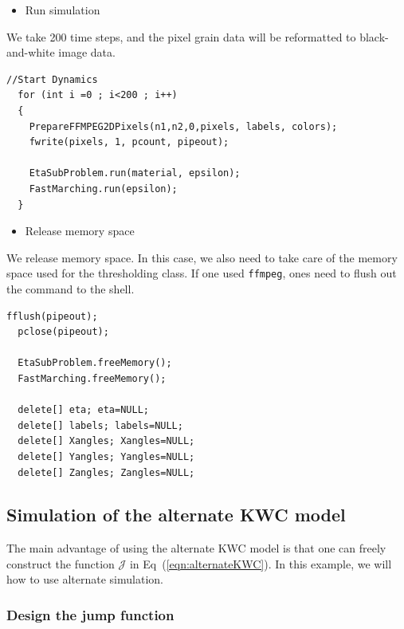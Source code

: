 \documentclass[11pt]{article}
\begin{document}
\begin{itemize} \item Run simulation \end{itemize}
We take 200 time steps, and the pixel grain data will be 
reformatted to black-and-white image data. \\
\begin{tcolorbox}
\begin{lstlisting}[basicstyle=\footnotesize]
  //Start Dynamics
  for (int i =0 ; i<200 ; i++)
  {
    PrepareFFMPEG2DPixels(n1,n2,0,pixels, labels, colors);
    fwrite(pixels, 1, pcount, pipeout);
      
    EtaSubProblem.run(material, epsilon);
    FastMarching.run(epsilon);
  }
\end{lstlisting}
\end{tcolorbox}

\begin{itemize} \item Release memory space \end{itemize}

We release memory space. In this case, we also need to take care of
the memory space used for the thresholding class. 
If one used \texttt{ffmpeg}, ones need to flush out the command 
to the shell. 
\begin{tcolorbox}
\begin{lstlisting}[basicstyle=\footnotesize]
  fflush(pipeout);
  pclose(pipeout);

  EtaSubProblem.freeMemory();
  FastMarching.freeMemory();
  
  delete[] eta; eta=NULL;
  delete[] labels; labels=NULL;
  delete[] Xangles; Xangles=NULL;
  delete[] Yangles; Yangles=NULL;
  delete[] Zangles; Zangles=NULL;
\end{lstlisting}
\end{tcolorbox}

\subsection{Simulation of the alternate KWC model}

The main advantage of using the alternate KWC model is
that one can freely construct the function $\mathcal{J}$ in Eq~(\ref{eqn:alternateKWC}).
In this example, we will how to use alternate simulation. 
 
\subsubsection{Design the jump function}
\end{document}
